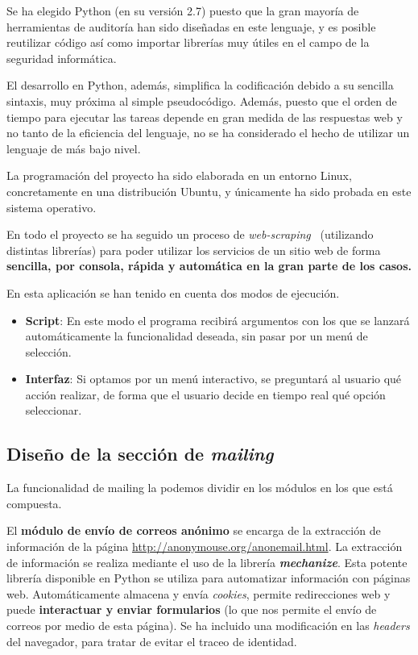 Se ha elegido Python (en su versión 2.7) puesto que la gran mayoría de herramientas de auditoría han sido diseñadas en este lenguaje, y es posible reutilizar código así como importar librerías muy útiles en el campo de la seguridad informática.

El desarrollo en Python, además, simplifica la codificación debido a su sencilla sintaxis, muy próxima al simple pseudocódigo. Además, puesto que el orden de tiempo para ejecutar las tareas depende en gran medida de las respuestas web y no tanto de la eficiencia del lenguaje, no se ha considerado el hecho de utilizar un lenguaje de más bajo nivel.

La programación del proyecto ha sido elaborada en un entorno Linux, concretamente en una distribución Ubuntu, y únicamente ha sido probada en este sistema operativo.

En todo el proyecto se ha seguido un proceso de \textit{web-scraping}~\cite{article:webscraping} (utilizando distintas librerías) para poder utilizar los servicios de un sitio web de forma \textbf{sencilla, por consola, rápida y automática en la gran parte de los casos.}

En esta aplicación se han tenido en cuenta dos modos de ejecución. 

\begin{itemize}
	\item \textbf{Script}: En este modo el programa recibirá argumentos con los que se lanzará automáticamente la funcionalidad deseada, sin pasar por un menú de selección.
	\item \textbf{Interfaz}: Si optamos por un menú interactivo, se preguntará al usuario qué acción realizar, de forma que el usuario decide en tiempo real qué opción seleccionar.
\end{itemize}

\subsection{Diseño de la sección de \textit{mailing}}

La funcionalidad de mailing la podemos dividir en los módulos en los que está compuesta. 

El \textbf{módulo de envío de correos anónimo} se encarga de la extracción de información de la página \url{http://anonymouse.org/anonemail.html}. La extracción de información se realiza mediante el uso de la librería \textbf{\textit{mechanize}}. Esta potente librería disponible en Python se utiliza para automatizar información con páginas web. Automáticamente almacena y envía \textit{cookies}, permite redirecciones web y puede \textbf{interactuar y enviar formularios} (lo que nos permite el envío de correos por medio de esta página).
Se ha incluido una modificación en las \textit{headers} del navegador, para tratar de evitar el traceo de identidad.

